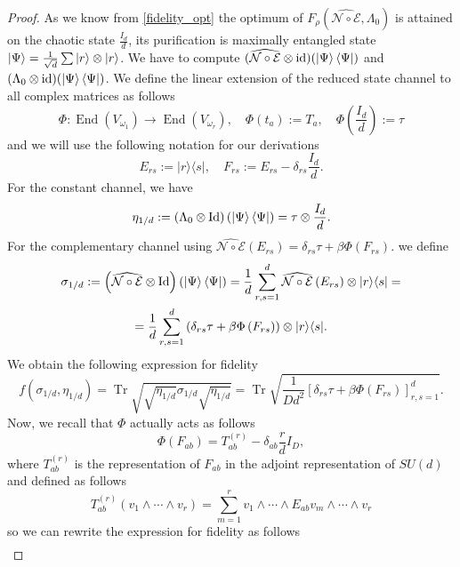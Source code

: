 \documentclass[11pt,letterpaper]{article}
\theoremstyle{plain}
\theoremstyle{plain}
\theoremstyle{plain}
\theoremstyle{plain}
\theoremstyle{plain}
\theoremstyle{plain}
\theoremstyle{plain}
\theoremstyle{definition}
\theoremstyle{plain}
\begin{document}
\begin{proof}
As we know from \ref{fidelity_opt} the optimum of $F_{\rho}(\widehat{\mathcal{N} \circ \mathcal{E}}, \Lambda_0)$ 
is attained on the chaotic state $\frac{I_d}{d}$, its purification is maximally entangled state $\ket{\Psi}=\frac{1}{\sqrt{d}}\sum |r\rangle \otimes|r\rangle $. 
We have to compute $(\widehat{\mathcal{N} \circ \mathcal{E}} \otimes \mathrm{id})(\ket{\Psi}\bra{\Psi})$ and $(\Lambda_0 \otimes \mathrm{id})(\ket{\Psi}\bra{\Psi})$.
We define the linear extension of the reduced state channel to all complex matrices as follows
$$
\Phi: \operatorname{End}\left(V_{\omega_1}\right) \rightarrow \operatorname{End}\left(V_{\omega_r}\right), \quad \Phi\left(t_a\right):=T_a, \quad \Phi\left(\frac{I_d}{d}\right):=\tau
$$
and we will use the following notation for our derivations
\begin{equation}\label{eq:matr_units}
     E_{r s}:=|r\rangle\langle s|, \quad F_{r s}:=E_{r s}-\delta_{r s} \frac{I_d}{d}.
\end{equation}
For the constant channel, we have
\[
     \eta_{1/d}:=(\Lambda_0 \otimes \mathrm{Id})\left(\ket{\Psi}\bra{\Psi}\right)=\tau \otimes \frac{I_d}{d}.
\]  
For the complementary channel using 
$
\widehat{\mathcal{N} \circ \mathcal{E}}\left(E_{r s}\right)=\delta_{r s} \tau+\beta \Phi\left(F_{r s}\right) .
$
we define 
\[
\begin{gathered}
     \sigma_{1/d}:=\left(\widehat{\mathcal{N} \circ \mathcal{E}} \otimes \mathrm{Id}\right)\left(\ket{\Psi}\bra{\Psi}\right)=
     \frac{1}{d}\sum_{r, s=1}^d \widehat{\mathcal{N} \circ \mathcal{E}}\left(E_{r s}\right) \otimes|r\rangle\langle s| =\\
     =\frac{1}{d}\sum_{r, s=1}^d \left(\delta_{r s} \tau+\beta \Phi\left(F_{r s}\right)\right) \otimes|r\rangle\langle s| .
\end{gathered}
\]
We obtain the following expression for fidelity
\[
     f\left(\sigma_{1/d}, \eta_{1/d}\right)=\operatorname{Tr}\sqrt{\sqrt{\eta_{1/d}} \sigma_{1/d} \sqrt{\eta_{1/d}}}=\operatorname{Tr} \sqrt{\frac{1}{Dd^2}\left[\delta_{r s} \tau+\beta \Phi\left(F_{r s}\right)\right]_{r, s=1}^d}.
\]
Now, we recall that $\Phi$ actually acts as follows
\[
        \Phi\left(F_{a b}\right)=T_{a b}^{(r)}-\delta_{a b} \frac{r}{d} I_D,
\]
where $T_{a b}^{(r)}$ is the representation of $F_{a b}$ in the adjoint representation of $SU(d)$ and defined as follows
\[
    T_{a b}^{(r)}\left(v_1 \wedge \cdots \wedge v_r\right)=\sum_{m=1}^r v_1 \wedge \cdots \wedge E_{a b} v_m \wedge \cdots \wedge v_r
\]
so we can rewrite the expression for fidelity as follows
\[
\begin{aligned}

\end{aligned}\]
\end{proof}
\end{document}
